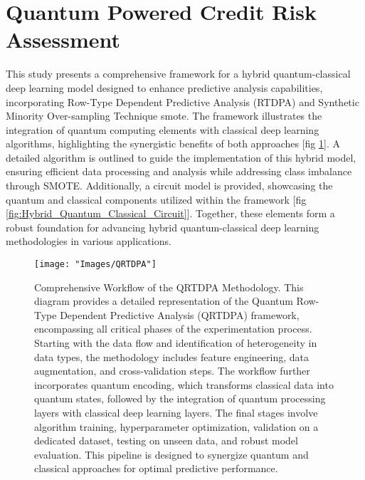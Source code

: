 \documentclass[a4paper]{article}
\begin{document}
\section{Quantum Powered Credit Risk Assessment}

This study presents a comprehensive framework for a hybrid quantum-classical deep learning model designed to enhance predictive analysis capabilities, incorporating Row-Type Dependent Predictive Analysis (RTDPA) and Synthetic Minority Over-sampling Technique \gls{smote}. The framework illustrates the integration of quantum computing elements with classical deep learning algorithms, highlighting the synergistic benefits of both approaches [fig \ref{fig:qrtdpa_methodology}]. A detailed algorithm is outlined to guide the implementation of this hybrid model, ensuring efficient data processing and analysis while addressing class imbalance through SMOTE. Additionally, a circuit model is provided, showcasing the quantum and classical components utilized within the framework [fig \ref{fig:Hybrid_Quantum_Classical_Circuit}]. Together, these elements form a robust foundation for advancing hybrid quantum-classical deep learning methodologies in various applications. 

\begin{figure}[H]
	\centering
	\texttt{[image: "Images/QRTDPA"]}	
	\begin{minipage}{0.85\textwidth}
		\caption{Comprehensive Workflow of the QRTDPA Methodology. This diagram provides a detailed representation of the Quantum Row-Type Dependent Predictive Analysis (QRTDPA) framework, encompassing all critical phases of the experimentation process. Starting with the data flow and identification of heterogeneity in data types, the methodology includes feature engineering, data augmentation, and cross-validation steps. The workflow further incorporates quantum encoding, which transforms classical data into quantum states, followed by the integration of quantum processing layers with classical deep learning layers. The final stages involve algorithm training, hyperparameter optimization, validation on a dedicated dataset, testing on unseen data, and robust model evaluation. This pipeline is designed to synergize quantum and classical approaches for optimal predictive performance.}	
	\label{fig:qrtdpa_methodology}
	\end{minipage}
\end{figure}

\vspace{0.7cm}
\end{document}
